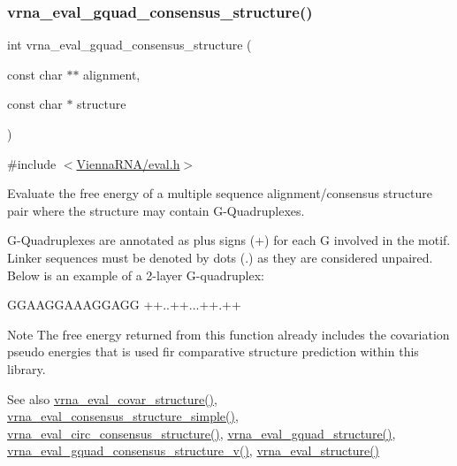 \subsubsection{\texorpdfstring{vrna\+\_\+eval\+\_\+gquad\+\_\+consensus\+\_\+structure()}{vrna\_eval\_gquad\_consensus\_structure()}}
{\footnotesize\ttfamily int vrna\+\_\+eval\+\_\+gquad\+\_\+consensus\+\_\+structure (\begin{DoxyParamCaption}\item[{const char $\ast$$\ast$}]{alignment,  }\item[{const char $\ast$}]{structure }\end{DoxyParamCaption})}



{\ttfamily \#include $<$\hyperlink{eval_8h}{Vienna\+R\+N\+A/eval.\+h}$>$}



Evaluate the free energy of a multiple sequence alignment/consensus structure pair where the structure may contain G-\/\+Quadruplexes. 

G-\/\+Quadruplexes are annotated as plus signs (\textquotesingle{}+\textquotesingle{}) for each G involved in the motif. Linker sequences must be denoted by dots (\textquotesingle{}.\textquotesingle{}) as they are considered unpaired. Below is an example of a 2-\/layer G-\/quadruplex\+: 
\begin{DoxyCode}
GGAAGGAAAGGAGG
++..++...++.++
\end{DoxyCode}


\begin{DoxyNote}{Note}
The free energy returned from this function already includes the covariation pseudo energies that is used fir comparative structure prediction within this library.
\end{DoxyNote}
\begin{DoxySeeAlso}{See also}
\hyperlink{group__eval_ga6cea75c0eb9857fb59172be54cab09e0}{vrna\+\_\+eval\+\_\+covar\+\_\+structure()}, \hyperlink{group__eval_ga7762c3a7bdcbc3a14ef93259d322c7d6}{vrna\+\_\+eval\+\_\+consensus\+\_\+structure\+\_\+simple()}, \hyperlink{group__eval_gac96577cf232c71160f762737a994b7c6}{vrna\+\_\+eval\+\_\+circ\+\_\+consensus\+\_\+structure()}, \hyperlink{group__eval_ga3263504825ef4b523eba797c99921df4}{vrna\+\_\+eval\+\_\+gquad\+\_\+structure()}, \hyperlink{group__eval_ga8abc794fc48d43268ced5e8cde017baa}{vrna\+\_\+eval\+\_\+gquad\+\_\+consensus\+\_\+structure\+\_\+v()}, \hyperlink{group__eval_ga58f199f1438d794a265f3b27fc8ea631}{vrna\+\_\+eval\+\_\+structure()}
\end{DoxySeeAlso}

